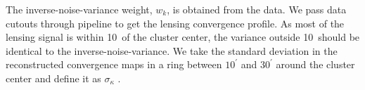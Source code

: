  
 The inverse-noise-variance weight, $w_{k}$, is obtained from the data.
  We pass data cutouts through pipeline to get the lensing convergence profile.
 As most of the lensing signal is within 10\am\ of the cluster center, the variance outside 10\am\ should be identical to the inverse-noise-variance.  
 We take the standard deviation in the reconstructed convergence maps in a ring between $10^{\prime}$ and $30^{\prime}$ around the cluster center and define it as $\sigma_{\kappa}$ . 

